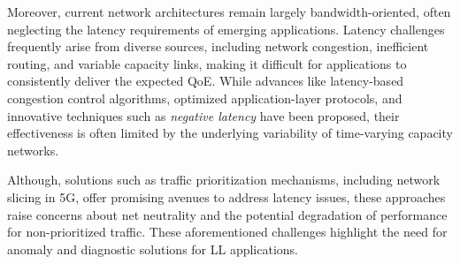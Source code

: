 Moreover, current network architectures remain largely bandwidth-oriented, often neglecting the latency requirements of emerging applications. Latency challenges frequently arise from diverse sources, including network congestion, inefficient routing, and variable capacity links, making it difficult for applications to consistently deliver the expected \ac{QoE}. While advances like latency-based congestion control algorithms, optimized application-layer protocols, and innovative techniques such as \textit{negative latency} \cite{engadgetGoogleWants} have been proposed, their effectiveness is often limited by the underlying variability of time-varying capacity networks.

Although, solutions such as traffic prioritization mechanisms, including network slicing in 5G, offer promising avenues to address latency issues, these approaches raise concerns about net neutrality and the potential degradation of performance for non-prioritized traffic. These aforementioned challenges highlight the need for anomaly and diagnostic solutions for \ac{LL} applications.

